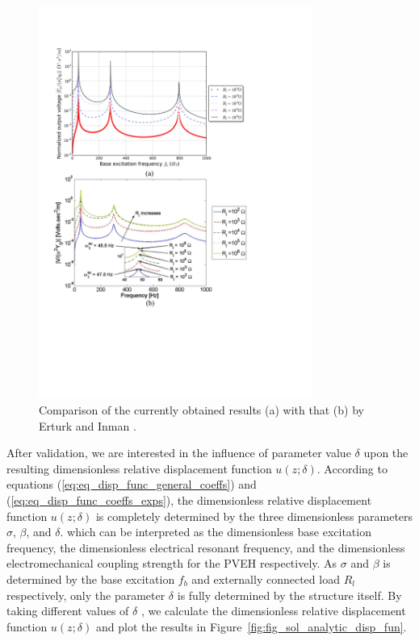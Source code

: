 \documentclass{svjour3}                     %
\begin{document}
\begin{figure}[!htbp]
    \centering
    \includegraphics[width=0.8\textwidth]{./img_eig_asy/fig_sol_analytic_perf_vs_fr_mod}
    \caption{Comparison of the currently obtained results (a) with that (b) by Erturk and Inman \cite{erturk2008distributed}.}
    \label{fig:fig_sol_analytic_perf_vs_fr_mod}
\end{figure}


After validation, we are interested in the influence of parameter value $\delta$ upon the resulting dimensionless relative displacement function $u(z;\delta)$. According to equations (\ref{eq:eq_disp_func_general_coeffs}) and (\ref{eq:eq_disp_func_coeffs_exps}), the dimensionless relative displacement function $u(z;\delta)$ is completely determined by the three dimensionless parameters $\sigma$, $\beta$, and $\delta$. which can be interpreted as the dimensionless base excitation frequency, the dimensionless electrical resonant frequency, and the dimensionless electromechanical coupling strength for the PVEH respectively. As $\sigma$ and $\beta$ is determined by the base excitation $f_b$ and externally connected load $R_l$ respectively, only the parameter $\delta$ is fully determined by the structure itself. By taking different values of $\delta$ , we calculate the dimensionless relative displacement function $u(z;\delta)$ and plot the results in Figure~\ref{fig:fig_sol_analytic_disp_fun}.
\end{document}

